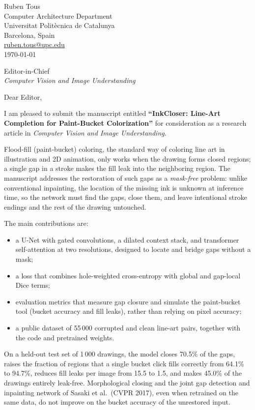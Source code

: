 \documentclass[11pt]{article}
\begin{document}
\begin{flushright}
Ruben Tous\\
Computer Architecture Department\\
Universitat Polit\`ecnica de Catalunya\\
Barcelona, Spain\\
\href{mailto:ruben.tous@upc.edu}{ruben.tous@upc.edu}\\[0.8em]
\today
\end{flushright}

Editor-in-Chief\\
\emph{Computer Vision and Image Understanding}

Dear Editor,

I am pleased to submit the manuscript entitled \textbf{``InkCloser: Line-Art Completion
for Paint-Bucket Colorization''} for consideration as a research article in
\emph{Computer Vision and Image Understanding}.

Flood-fill (paint-bucket) coloring, the standard way of coloring line art in
illustration and 2D animation, only works when the drawing forms closed regions; a
single gap in a stroke makes the fill leak into the neighboring region. The manuscript
addresses the restoration of such gaps as a \emph{mask-free} problem: unlike
conventional inpainting, the location of the missing ink is unknown at inference time,
so the network must find the gaps, close them, and leave intentional stroke endings and
the rest of the drawing untouched.

The main contributions are:
\begin{itemize}\setlength{\itemsep}{1pt}
\item a U-Net with gated convolutions, a dilated context stack, and transformer
  self-attention at two resolutions, designed to locate and bridge gaps without a mask;
\item a loss that combines hole-weighted cross-entropy with global and gap-local Dice
  terms;
\item evaluation metrics that measure gap closure and simulate the paint-bucket tool
  (bucket accuracy and fill leaks), rather than relying on pixel accuracy;
\item a public dataset of 55\,000 corrupted and clean line-art pairs, together with the
  code and pretrained weights.
\end{itemize}

On a held-out test set of 1\,000 drawings, the model closes 70.5\% of the gaps, raises
the fraction of regions that a single bucket click fills correctly from 64.1\% to
94.7\%, reduces fill leaks per image from 15.5 to 1.5, and makes 45.0\% of the drawings
entirely leak-free. Morphological closing and the joint gap detection and inpainting
network of Sasaki et al.\ (CVPR 2017), even when retrained on the same data, do not
improve on the bucket accuracy of the unrestored input.
\end{document}
